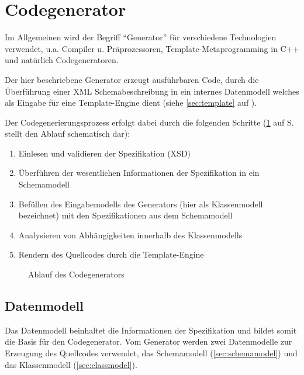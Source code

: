 \section{Codegenerator}


Im Allgemeinen wird der Begriff \enquote{Generator} für verschiedene Technologien verwendet, u.a. Compiler u. Präprozessoren, Template-Metaprogramming in C++ und natürlich Codegeneratoren.

Der hier beschriebene Generator erzeugt ausführbaren Code, durch die Überführung einer XML Schemabeschreibung in ein internes Datenmodell welches als Eingabe für eine Template-Engine dient (siehe \cref{sec:template} auf \pageref{sec:template}).

Der Codegenerierungsprozess erfolgt dabei durch die folgenden Schritte (\cref{fig:flow} auf S. \pageref{fig:flow} stellt den Ablauf schematisch dar):

\begin{enumerate}
    \item Einlesen und validieren der Spezifikation (\gls{XSD})
    \item Überführen der wesentlichen Informationen der Spezifikation in ein Schemamodell
    \item Befüllen des Eingabemodells des Generators (hier als Klassenmodell bezeichnet) mit den Spezifikationen aus dem Schemamodell
    \item Analysieren von Abhängigkeiten innerhalb des Klassenmodells
    \item Rendern des Quellcodes durch die Template-Engine
\end{enumerate}

\begin{figure}[h]
    \centering
    \resizebox{!}{0.7\textwidth}{
        
    }
    \caption{Ablauf des Codegenerators}
    \label{fig:flow}
\end{figure}

\subsection{Datenmodell}

Das Datenmodell beinhaltet die Informationen der Spezifikation und bildet somit die Basis für den Codegenerator.
Vom Generator werden zwei Datenmodelle zur Erzeugung des Quellcodes verwendet, das Schemamodell (\cref{sec:schemamodel}) und das Klassenmodell (\cref{sec:classmodel}).

